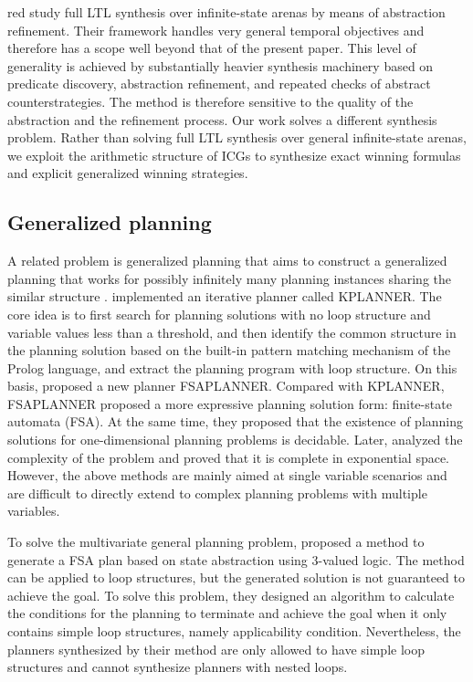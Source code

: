 \documentclass[review]{elsarticle}
\begin{document}
\begin{color}{red}
\citet{AzzopardiPDS2025} study full LTL synthesis over infinite-state arenas by means of abstraction refinement.
Their framework handles very general temporal objectives and therefore has a scope well beyond that of the present paper.
This level of generality is achieved by substantially heavier synthesis machinery based on predicate discovery, abstraction refinement, and repeated checks of abstract counterstrategies.
The method is therefore sensitive to the quality of the abstraction and the refinement process.
Our work solves a different synthesis problem.
Rather than solving full LTL synthesis over general infinite-state arenas, we exploit the arithmetic structure of ICGs to synthesize exact winning formulas and explicit generalized winning strategies.
\end{color}

\subsection{Generalized planning} 
A related problem is generalized planning that aims to construct a generalized planning that works for possibly infinitely many planning instances sharing the similar structure \cite{Lev2005}.
\citet{Lev2005} implemented an iterative planner called KPLANNER. 
The core idea is to first search for planning solutions with no loop structure and variable values less than a threshold, and then identify the common structure in the planning solution based on the built-in pattern matching mechanism of the Prolog language, and extract the planning program with loop structure. 
On this basis, \citet{HuL2010} proposed a new planner FSAPLANNER. Compared with KPLANNER, FSAPLANNER proposed a more expressive planning solution form: finite-state automata (FSA). 
At the same time, they proposed that the existence of planning solutions for one-dimensional planning problems is decidable. 
Later, \citet{HuG2011} analyzed the complexity of the problem and proved that it is complete in exponential space. 
However, the above methods are mainly aimed at single variable scenarios and are difficult to directly extend to complex planning problems with multiple variables.

To solve the multivariate general planning problem, \citet{SriIZ2011} proposed a method to generate a FSA plan based on state abstraction using 3-valued logic. 
The method can be applied to loop structures, but the generated solution is not guaranteed to achieve the goal. 
To solve this problem, they designed an algorithm to calculate the conditions for the planning to terminate and achieve the goal when it only contains simple loop structures, namely applicability
condition\cite{SriIZ2012}. 
Nevertheless, the planners synthesized by their method are only allowed to have simple loop structures and cannot synthesize planners with nested loops.
\end{document}
